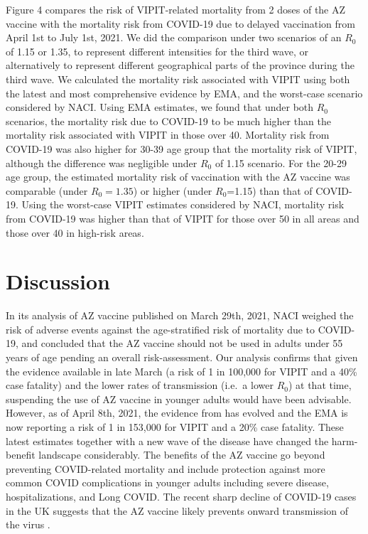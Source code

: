 \documentclass[]{interact}
\theoremstyle{plain}%
\theoremstyle{definition}
\theoremstyle{remark}
\begin{document}
Figure 4 compares the risk of VIPIT-related mortality from 2 doses of
the AZ vaccine with the mortality risk from COVID-19 due to delayed
vaccination from April 1st to July 1st, 2021. We did the comparison
under two scenarios of an \(R_0\) of 1.15 or 1.35, to represent
different intensities for the third wave, or alternatively to represent
different geographical parts of the province during the third wave. We
calculated the mortality risk associated with VIPIT using both the
latest and most comprehensive evidence by EMA, and the worst-case
scenario considered by NACI. Using EMA estimates, we found that under
both \(R_0\) scenarios, the mortality risk due to COVID-19 to be much
higher than the mortality risk associated with VIPIT in those over 40.
Mortality risk from COVID-19 was also higher for 30-39 age group that
the mortality risk of VIPIT, although the difference was negligible
under \(R_0\) of 1.15 scenario. For the 20-29 age group, the estimated
mortality risk of vaccination with the AZ vaccine was comparable (under
\(R_0=1.35\)) or higher (under \(R_0\)=1.15) than that of COVID-19.
Using the worst-case VIPIT estimates considered by NACI, mortality risk
from COVID-19 was higher than that of VIPIT for those over 50 in all
areas and those over 40 in high-risk areas.

\hypertarget{discussion}{%
\section{Discussion}\label{discussion}}

In its analysis of AZ vaccine published on March 29th, 2021, NACI
weighed the risk of adverse events against the age-stratified risk of
mortality due to COVID-19, and concluded that the AZ vaccine should not
be used in adults under 55 years of age pending an overall
risk-assessment. Our analysis confirms that given the evidence available
in late March (a risk of 1 in 100,000 for VIPIT and a 40\% case
fatality) and the lower rates of transmission (i.e.~a lower \(R_0\)) at
that time, suspending the use of AZ vaccine in younger adults would have
been advisable. However, as of April 8th, 2021, the evidence from has
evolved and the EMA is now reporting a risk of 1 in 153,000 for VIPIT
and a 20\% case fatality. These latest estimates together with a new
wave of the disease have changed the harm-benefit landscape
considerably. The benefits of the AZ vaccine go beyond preventing
COVID-related mortality and include protection against more common COVID
complications in younger adults including severe disease,
hospitalizations, and Long COVID. The recent sharp decline of COVID-19
cases in the UK suggests that the AZ vaccine likely prevents onward
transmission of the virus \citep{our_world_in_data_covid-19_2021}.
\end{document}
